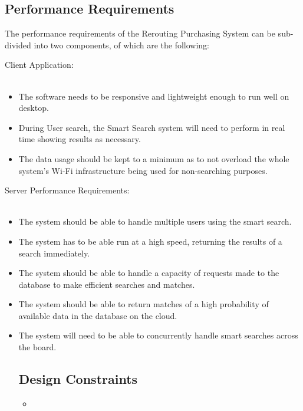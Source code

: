 \documentclass[a4paper,10pt]{article}
\begin{document}
{	\subsection{Performance Requirements}
	The performance requirements of the Rerouting Purchasing System can be sub-divided into two components, of which are the following:
	
	\item Client Application:\\\\
		\begin{itemize}
		\item The software needs to be responsive and lightweight enough to run well on desktop.\\
		\item During User search, the Smart Search system will need to perform in real time showing results as necessary.\\
		\item The data usage should be kept to a minimum as to not overload the whole system's Wi-Fi infrastructure being used for non-searching purposes.\\
		\end{itemize}
	
	\item Server Performance Requirements:\\\\
		\begin{itemize}
		\item The system should be able to handle multiple users using the smart search.\\
		\item The system has to be able run at a high speed, returning the results of a search immediately.\\
		\item The system should be able to handle a capacity of requests made to the database to make efficient searches and matches. \\
		\item The system should be able to return matches of a high probability of available data in the database on the cloud.\\
		\item The system will need to be able to concurrently handle smart searches across the board.
		
	\subsection{Design Constraints}
	\begin{itemize}
		\item
	\end{itemize}


\end{itemize}}
\end{document}
